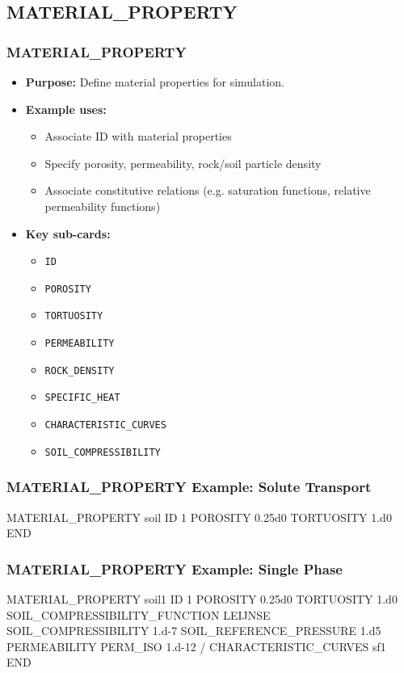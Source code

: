 \subsection{MATERIAL\_PROPERTY}

\begin{frame}\frametitle{MATERIAL\_PROPERTY}

\begin{itemize}
\item[] \textbf{Purpose:} Define material properties for simulation.
\item[] \textbf{Example uses:}
\begin{itemize}
  \item Associate ID with material properties
  \item Specify porosity, permeability, rock/soil particle density
  \item Associate constitutive relations (e.g. saturation functions, relative permeability functions)
\end{itemize}
\item[] \textbf{Key sub-cards:}
\begin{itemize}
  \item[] \verb|ID|
  \item[] \verb|POROSITY|
  \item[] \verb|TORTUOSITY|
  \item[] \verb|PERMEABILITY|
  \item[] \verb|ROCK_DENSITY|
  \item[] \verb|SPECIFIC_HEAT|
  \item[] \verb|CHARACTERISTIC_CURVES|
  \item[] \verb|SOIL_COMPRESSIBILITY|
\end{itemize}
\end{itemize}

\end{frame}

\begin{frame}[fragile]\frametitle{MATERIAL\_PROPERTY Example: Solute Transport}

\begin{semiverbatim}
MATERIAL_PROPERTY soil
  ID 1
  POROSITY 0.25d0
  TORTUOSITY 1.d0
END
\end{semiverbatim}

\end{frame}

\begin{frame}[fragile]\frametitle{MATERIAL\_PROPERTY Example: Single Phase}

\begin{semiverbatim}
MATERIAL_PROPERTY soil1
  ID 1
  POROSITY 0.25d0
  TORTUOSITY 1.d0
  SOIL_COMPRESSIBILITY_FUNCTION LEIJNSE
  SOIL_COMPRESSIBILITY 1.d-7
  SOIL_REFERENCE_PRESSURE 1.d5
  PERMEABILITY
    PERM_ISO 1.d-12
  /
  CHARACTERISTIC_CURVES sf1
END
\end{semiverbatim}

\end{frame}

